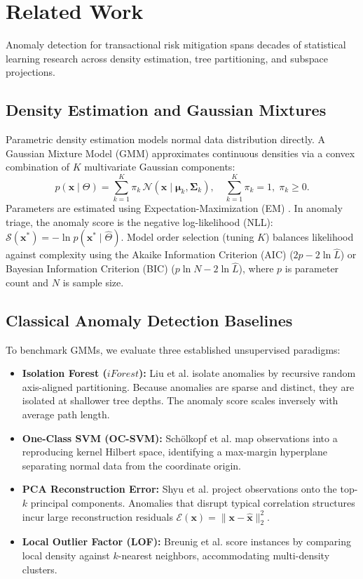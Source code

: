 \section{Related Work}
\label{sec:related_work}

Anomaly detection for transactional risk mitigation spans decades of statistical learning research across density estimation, tree partitioning, and subspace projections.

\subsection{Density Estimation and Gaussian Mixtures}
Parametric density estimation models normal data distribution directly. A Gaussian Mixture Model (GMM) approximates continuous densities via a convex combination of $K$ multivariate Gaussian components:
\begin{equation}
    p(\mathbf{x} \mid \Theta) = \sum_{k=1}^K \pi_k \, \mathcal{N}(\mathbf{x} \mid \boldsymbol{\mu}_k, \boldsymbol{\Sigma}_k), \quad \sum_{k=1}^K \pi_k = 1, \; \pi_k \ge 0.
\end{equation}
Parameters are estimated using Expectation-Maximization (EM) \cite{dempster1977maximum}. In anomaly triage, the anomaly score is the negative log-likelihood (NLL): $\mathcal{S}(\mathbf{x}^*) = -\ln p(\mathbf{x}^* \mid \hat{\Theta})$. Model order selection (tuning $K$) balances likelihood against complexity using the Akaike Information Criterion (AIC) \cite{akaike1974new} ($2p - 2\ln \hat{L}$) or Bayesian Information Criterion (BIC) \cite{schwarz1978estimating} ($p \ln N - 2\ln \hat{L}$), where $p$ is parameter count and $N$ is sample size.

\subsection{Classical Anomaly Detection Baselines}
To benchmark GMMs, we evaluate three established unsupervised paradigms:
\begin{itemize}
    \item \textbf{Isolation Forest ($iForest$):} Liu et al. \cite{liu2008isolation} isolate anomalies by recursive random axis-aligned partitioning. Because anomalies are sparse and distinct, they are isolated at shallower tree depths. The anomaly score scales inversely with average path length.
    \item \textbf{One-Class SVM (OC-SVM):} Sch{\"o}lkopf et al. \cite{scholkopf2001estimating} map observations into a reproducing kernel Hilbert space, identifying a max-margin hyperplane separating normal data from the coordinate origin.
    \item \textbf{PCA Reconstruction Error:} Shyu et al. \cite{shyu2003novel} project observations onto the top-$k$ principal components. Anomalies that disrupt typical correlation structures incur large reconstruction residuals $\mathcal{E}(\mathbf{x}) = \|\mathbf{x} - \hat{\mathbf{x}}\|_2^2$.
    \item \textbf{Local Outlier Factor (LOF):} Breunig et al. \cite{breunig2000lof} score instances by comparing local density against $k$-nearest neighbors, accommodating multi-density clusters.
\end{itemize}

